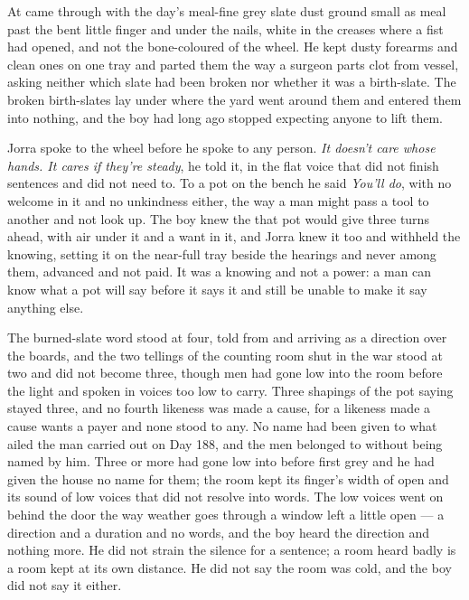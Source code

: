 At   came through with the day's meal-fine grey slate dust ground small as meal past the bent little finger and under the nails, white in the creases where a fist had opened, and not the bone-coloured  of the wheel. He kept dusty forearms and clean ones on one tray and parted them the way a surgeon parts clot from vessel, asking neither which slate had been broken nor whether it was a birth-slate. The broken birth-slates lay under  where the yard went around them and entered them into nothing, and the boy had long ago stopped expecting anyone to lift them.

Jorra spoke to the wheel before he spoke to any person. \emph{It doesn't care whose hands. It cares if they're steady}, he told it, in the flat voice that did not finish sentences and did not need to. To a pot on the bench he said \emph{You'll do}, with no welcome in it and no unkindness either, the way a man might pass a tool to another and not look up. The boy knew the  that pot would give three turns ahead, with air under it and a want in it, and Jorra knew it too and withheld the knowing, setting it on the near-full tray beside the hearings and never among them, advanced and not paid. It was a knowing and not a power: a man can know what a pot will say before it says it and still be unable to make it say anything else.

The burned-slate word stood at four, told from  and arriving as a direction over the boards, and the two tellings of the counting room shut in the war stood at two and did not become three, though men had gone low into the room before the light and spoken in voices too low to carry. Three shapings of the pot saying stayed three, and no fourth likeness was made a cause, for a likeness made a cause wants a payer and none stood to any. No name had been given to what ailed the man carried out on Day 188, and the men belonged to  without being named by him. Three or more had gone low into  before first grey and he had given the house no name for them; the room kept its finger's width of open and its sound of low voices that did not resolve into words. The low voices went on behind the door the way weather goes through a window left a little open --- a direction and a duration and no words, and the boy heard the direction and nothing more. He did not strain the silence for a sentence; a room heard badly is a room kept at its own distance. He did not say the room was cold, and the boy did not say it either.

